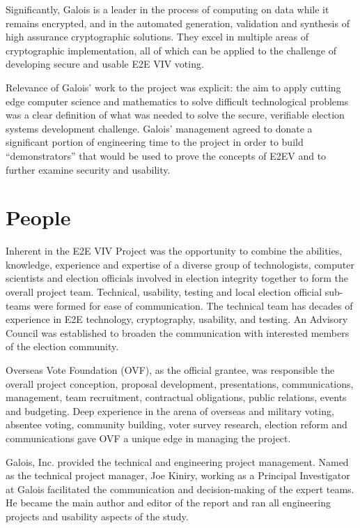 Significantly, Galois is a leader in the process of computing on data
while it remains encrypted, and in the automated generation,
validation and synthesis of high assurance cryptographic
solutions. They excel in multiple areas of cryptographic
implementation, all of which can be applied to the challenge of
developing secure and usable E2E VIV voting.

Relevance of Galois’ work to the project was explicit: the aim to
apply cutting edge computer science and mathematics to solve difficult
technological problems was a clear definition of what was needed to
solve the secure, verifiable election systems development
challenge. Galois’ management agreed to donate a significant portion
of engineering time to the project in order to build “demonstrators”
that would be used to prove the concepts of E2EV and to further
examine security and usability.

\section{People}

Inherent in the E2E VIV Project was the opportunity to combine the
abilities, knowledge, experience and expertise of a diverse group of
technologists, computer scientists and election officials involved in
election integrity together to form the overall project
team. Technical, usability, testing and local election official
sub-teams were formed for ease of communication. The technical team
has decades of experience in E2E technology, cryptography, usability,
and testing. An Advisory Council was established to broaden the
communication with interested members of the election community. 

Overseas Vote Foundation (OVF), as the official grantee, was
responsible the overall project conception, proposal development,
presentations, communications, management, team recruitment,
contractual obligations, public relations, events and budgeting. Deep
experience in the arena of overseas and military voting, absentee
voting, community building, voter survey research, election reform and
communications gave OVF a unique edge in managing the project. 

Galois, Inc. provided the technical and engineering project
management. Named as the technical project manager, Joe Kiniry,
working as a Principal Investigator at Galois facilitated the
communication and decision-making of the expert teams. He became the
main author and editor of the report and ran all engineering projects
and usability aspects of the study. 

